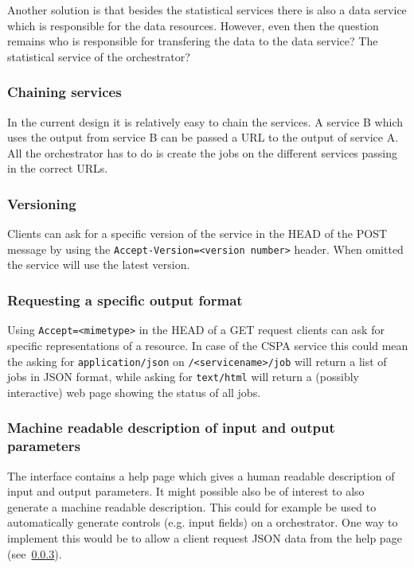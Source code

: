 \documentclass[a4paper]{article}
\begin{document}
Another solution is that besides the statistical services there is also a data
service which is responsible for the data resources. However, even then the
question remains who is responsible for transfering the data to the data
service? The statistical service of the orchestrator? 

\subsubsection{Chaining services}
In the current design it is relatively easy to chain the services. A service B
which uses the output from service B can be passed a URL to the output of
service A. All the orchestrator has to do is create the jobs on the different
services passing in the correct URLs. 

\subsubsection{Versioning}
Clients can ask for a specific version of the service in the HEAD of the POST
message by using the \texttt{Accept-Version=<version number>} header. When
omitted the service will use the latest version.


\subsubsection{Requesting a specific output format}
\label{sec:outputformat}
Using \texttt{Accept=<mimetype>} in the HEAD of a GET request clients can ask for
specific representations of a resource. In case of the CSPA service this could
mean the asking for \texttt{application/json} on \texttt{/<servicename>/job}
will return a list of jobs in JSON format, while asking for \texttt{text/html}
will return a (possibly interactive) web page showing the status of all jobs.


\subsubsection{Machine readable description of input and output parameters}
The interface contains a help page which gives a human readable description of
input and output parameters. It might possible also be of interest to also
generate a machine readable description. This could for example be used to
automatically generate controls (e.g. input fields) on a orchestrator. One way
to implement this would be to allow a client request JSON data from the help
page (see~\ref{sec:outputformat}). 
\end{document}
